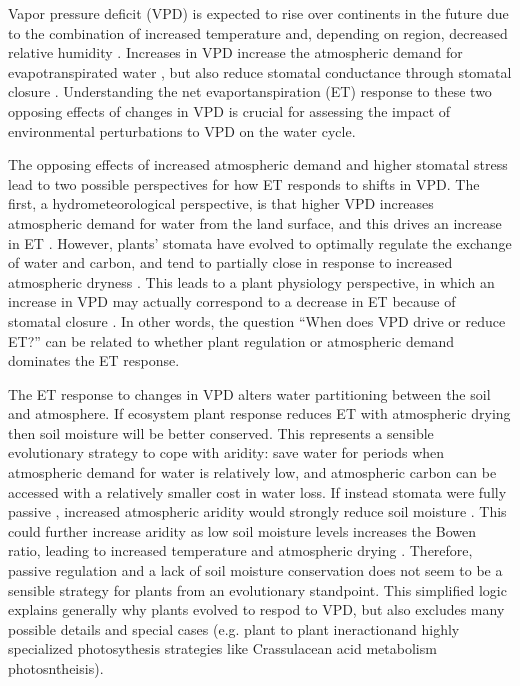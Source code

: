 Vapor pressure deficit (VPD) is expected to rise over continents in
the future due to the combination of increased temperature and,
depending on region, decreased relative humidity
\citep{Byrne_2013}. Increases in VPD increase the atmospheric demand
for evapotranspirated water \citep{Penman_1948, Monteith_1965}, but
also reduce stomatal conductance through stomatal closure
\citep{Rawson1977, Leuning_1990, Mott2007,
Damour2010, MEDLYN_2011}. Understanding the net evaportanspiration (ET) response
to these two opposing effects of changes in VPD is crucial for
assessing the impact of environmental perturbations to VPD on the
water cycle.

The opposing effects of increased atmospheric demand and higher
stomatal stress lead to two possible perspectives for how ET responds
to shifts in VPD. The first, a hydrometeorological perspective, is
that higher VPD increases atmospheric demand for water from the land
surface, and this drives an increase in ET
\citep{Penman_1948}. However, plants' stomata have evolved to
optimally regulate the exchange of water and carbon, and tend to
partially close in response to increased atmospheric dryness
\citep{Farquhar_1978, Ball_1987, Leuning_1990, Katul_2009, MEDLYN_2011}. This
leads to a plant physiology perspective, in which an increase in VPD
may actually correspond to a decrease in ET because of stomatal
closure \citep[e.g.][]{Rigden_2017}.  In other words, the question
``When does VPD drive or reduce ET?'' can be related to whether plant
regulation or atmospheric demand dominates the ET response.

The ET response to changes in VPD alters water partitioning between
the soil and atmosphere. If ecosystem plant response reduces ET with
atmospheric drying then soil moisture will be better conserved. This
represents a sensible evolutionary strategy to cope with aridity: save
water for periods when atmospheric demand for water is relatively low,
and atmospheric carbon can be accessed with a relatively smaller cost
in water loss. If instead stomata were fully passive \citep [similar
to soil pores, e.g. ][]{Or_2013}, increased atmospheric aridity would
strongly reduce soil moisture \citep{Berg_2017}. This could further
increase aridity as low soil moisture levels increases the Bowen
ratio, leading to increased temperature and atmospheric drying
\citep[][]{Bouchet_1963, Morton_1965, Brutsaert_1999, Ozdogan_2006,
Salvucci_2013, Gentine_2016, Berg_2016, Zhou_2019}. Therefore, passive
regulation and a lack of soil moisture conservation does not seem to
be a sensible strategy for plants from an evolutionary
standpoint. This simplified logic explains generally why plants
evolved to respod to VPD, but also excludes many possible details and
special cases (e.g. plant to plant ineractionand highly specialized
photosythesis strategies like Crassulacean acid metabolism
photosntheisis).

